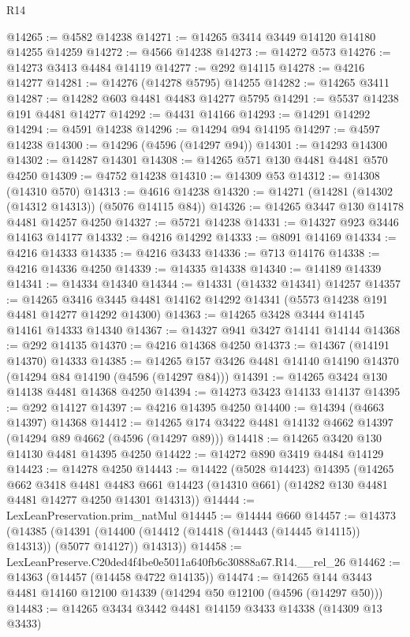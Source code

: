 \begin{lexlean}{R14}
\begin{coremodule}
@14265 := @4582 @14238
@14271 := @14265 @3414 @3449 @14120 @14180 @14255 @14259
@14272 := @4566 @14238
@14273 := @14272 @573
@14276 := @14273 @3413 @4484 @14119
@14277 := @292 @14115
@14278 := @4216 @14277
@14281 := @14276 (@14278 @5795) @14255
@14282 := @14265 @3411
@14287 := @14282 @603 @4481 @4483 @14277 @5795
@14291 := @5537 @14238 @191 @4481 @14277
@14292 := @4431 @14166
@14293 := @14291 @14292
@14294 := @4591 @14238
@14296 := @14294 @94 @14195
@14297 := @4597 @14238
@14300 := @14296 (@4596 (@14297 @94))
@14301 := @14293 @14300
@14302 := @14287 @14301
@14308 := @14265 @571 @130 @4481 @4481 @570 @4250
@14309 := @4752 @14238
@14310 := @14309 @53
@14312 := @14308 (@14310 @570)
@14313 := @4616 @14238
@14320 := @14271 (@14281 (@14302 (@14312 @14313)) (@5076 @14115 @84))
@14326 := @14265 @3447 @130 @14178 @4481 @14257 @4250
@14327 := @5721 @14238
@14331 := @14327 @923 @3446 @14163 @14177
@14332 := @4216 @14292
@14333 := @8091 @14169
@14334 := @4216 @14333
@14335 := @4216 @3433
@14336 := @713 @14176
@14338 := @4216 @14336 @4250
@14339 := @14335 @14338
@14340 := @14189 @14339
@14341 := @14334 @14340
@14344 := @14331 (@14332 @14341) @14257
@14357 := @14265
    @3416
    @3445
    @4481
    @14162
    @14292
    @14341
    (@5573 @14238 @191 @4481 @14277 @14292 @14300)
@14363 := @14265 @3428 @3444 @14145 @14161 @14333 @14340
@14367 := @14327 @941 @3427 @14141 @14144
@14368 := @292 @14135
@14370 := @4216 @14368 @4250
@14373 := @14367 (@14191 @14370) @14333
@14385 := @14265 @157 @3426 @4481 @14140 @14190 @14370 (@14294 @84 @14190 (@4596 (@14297 @84)))
@14391 := @14265 @3424 @130 @14138 @4481 @14368 @4250
@14394 := @14273 @3423 @14133 @14137
@14395 := @292 @14127
@14397 := @4216 @14395 @4250
@14400 := @14394 (@4663 @14397) @14368
@14412 := @14265 @174 @3422 @4481 @14132 @4662 @14397 (@14294 @89 @4662 (@4596 (@14297 @89)))
@14418 := @14265 @3420 @130 @14130 @4481 @14395 @4250
@14422 := @14272 @890 @3419 @4484 @14129
@14423 := @14278 @4250
@14443 := @14422
    (@5028 @14423)
    @14395
    (@14265
      @662
      @3418
      @4481
      @4483
      @661
      @14423
      (@14310 @661)
      (@14282 @130 @4481 @4481 @14277 @4250 @14301 @14313))
@14444 := LexLeanPreservation.prim_natMul
@14445 := @14444 @660
@14457 := @14373
    (@14385
      (@14391 (@14400 (@14412 (@14418 (@14443 (@14445 @14115)) @14313)) (@5077 @14127)) @14313))
@14458 := LexLeanPreserve.C20ded4f4be0e5011a640fb6c30888a67.R14.__rel_26
@14462 := @14363 (@14457 (@14458 @4722 @14135))
@14474 := @14265 @144 @3443 @4481 @14160 @12100 @14339 (@14294 @50 @12100 (@4596 (@14297 @50)))
@14483 := @14265 @3434 @3442 @4481 @14159 @3433 @14338 (@14309 @13 @3433)

\end{coremodule}
\end{lexlean}
